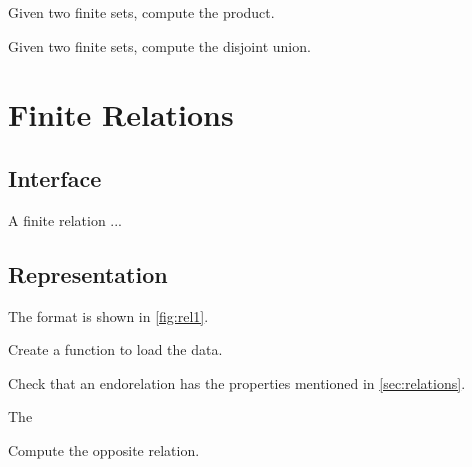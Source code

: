 \begin{exercise}
  Given two finite sets, compute the product.


\end{exercise}
\begin{exercise}
  Given two finite sets, compute the disjoint union.


\end{exercise}


\section{Finite Relations}

\subsection*{Interface}

A finite relation  ...


\subsection*{Representation}

The format is shown in \cref{fig:rel1}.


\begin{exercise}
  Create a function to load the data.


%

\end{exercise}


%  

\begin{exercise}

  Check that an endorelation has the properties mentioned in \cref{sec:relations}.

  The

\end{exercise}




\begin{exercise}[Opposite]
  Compute the opposite relation.


\end{exercise}

